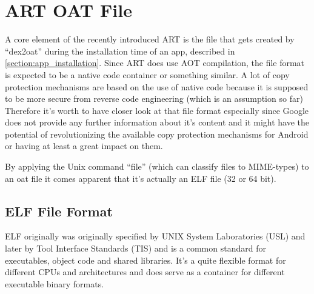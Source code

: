 \chapter{ART OAT File}
\label{chapter:art_oat_file_inspection}

A core element of the recently introduced ART is the file that
gets created by ``dex2oat'' during the installation time of an app,
described in \autoref{section:app_installation}.
Since ART does use AOT compilation, the file format is expected
to be a native code container or something similar. A lot of copy
protection mechanisms are based on the use of native code because
it is supposed to be more secure from reverse code engineering
(which is an assumption so far)
Therefore it's worth to have closer look at that file format
especially since Google does not provide any further information
about it's content and it might have the potential of
revolutionizing the available copy protection mechanisms for
Android or having at least a great impact on them.

By applying the Unix command ``file'' (which can classify
files to MIME-types) to an oat file it comes apparent that
it's actually an ELF file (32 or 64 bit).

\section{ELF File Format}
ELF originally was originally specified by UNIX System Laboratories
(USL) and later by Tool Interface Standards (TIS) and is a common
standard for executables, object code and shared libraries.
It's a quite flexible format for different CPUs and architectures
and does serve as a container for different executable binary
formats.

